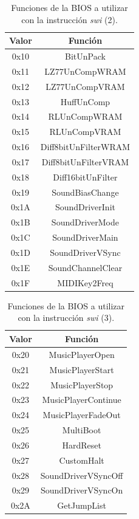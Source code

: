 \begin{table}[h]
	\centering
	\begin{tabular}{| c | c |}
		\hline
		\textbf{Valor} & \textbf{Función}  \\ \hline
		0x10 & BitUnPack \\ \hline
		0x11 & LZ77UnCompWRAM \\ \hline
		0x12 & LZ77UnCompVRAM \\ \hline
		0x13 & HuffUnComp \\ \hline
		0x14 & RLUnCompWRAM \\ \hline
		0x15 & RLUnCompVRAM \\ \hline
		0x16 & Diff8bitUnFilterWRAM \\ \hline
		0x17 & Diff8bitUnFilterVRAM \\ \hline
		0x18 & Diff16bitUnFilter \\ \hline
		0x19 & SoundBiasChange \\ \hline
		0x1A & SoundDriverInit \\ \hline
		0x1B & SoundDriverMode \\ \hline
		0x1C & SoundDriverMain \\ \hline
		0x1D & SoundDriverVSync \\ \hline
		0x1E & SoundChannelClear \\ \hline
		0x1F & MIDIKey2Freq \\ \hline
	\end{tabular}
	\caption{Funciones de la BIOS a utilizar con la instrucción \textit{swi} (2).}\label{tab:ap_bios_2}
\end{table}

\begin{table}[h]
	\centering
	\begin{tabular}{| c | c |}
		\hline
		\textbf{Valor} & \textbf{Función}  \\ \hline
		0x20 & MusicPlayerOpen \\ \hline
		0x21 & MusicPlayerStart \\ \hline
		0x22 & MusicPlayerStop \\ \hline
		0x23 & MusicPlayerContinue \\ \hline
		0x24 & MusicPlayerFadeOut \\ \hline
		0x25 & MultiBoot \\ \hline
		0x26 & HardReset \\ \hline
		0x27 & CustomHalt \\ \hline
		0x28 & SoundDriverVSyncOff \\ \hline
		0x29 & SoundDriverVSyncOn \\ \hline
		0x2A & GetJumpList \\ \hline
	\end{tabular}
	\caption{Funciones de la BIOS a utilizar con la instrucción \textit{swi} (3).}\label{tab:ap_bios_3}
\end{table}
\FloatBarrier{}

